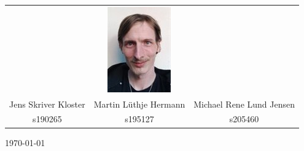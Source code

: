 \begin{titlepage}
\begin{center}
\begin{tabular}{|c|c|c|}
&
\includegraphics[scale=0.8]{figures/michael.png}
\\
Jens Skriver Kloster
&
Martin Lüthje Hermann
&
Michael Rene Lund Jensen
\\
s190265
&
s195127
&
s205460\\
\hline
\end{tabular}
\centering \today %
\end{center}
\end{titlepage}